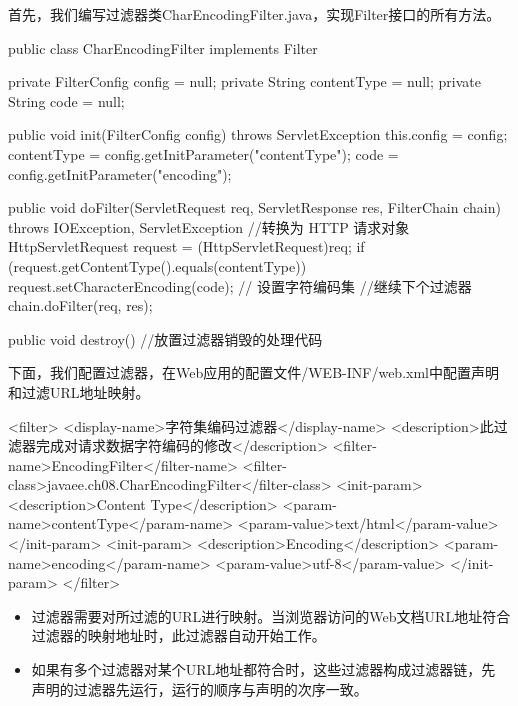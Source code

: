首先，我们编写过滤器类CharEncodingFilter.java，实现Filter接口的所有方法。


\begin{javaCode}
  public class CharEncodingFilter implements Filter {
    private FilterConfig config = null;
    private String contentType = null;
    private String code = null;

    public void init(FilterConfig config) throws ServletException {
      this.config = config;
      contentType = config.getInitParameter("contentType");
      code = config.getInitParameter("encoding");
    }

    public void doFilter(ServletRequest req, ServletResponse res, FilterChain chain) 
    throws IOException, ServletException {
      //转换为 HTTP 请求对象
      HttpServletRequest request = (HttpServletRequest)req;
      if (request.getContentType().equals(contentType)) {
        request.setCharacterEncoding(code); // 设置字符编码集
      }
      //继续下个过滤器
      chain.doFilter(req, res);
    }

    public void destroy() {
      //放置过滤器销毁的处理代码
    }
  }
\end{javaCode}

下面，我们配置过滤器，在Web应用的配置文件/WEB-INF/web.xml中配置声明和过滤URL地址映射。


\begin{xmlCode}
  <filter>
    <display-name>字符集编码过滤器</display-name>
    <description>此过滤器完成对请求数据字符编码的修改</description>
    <filter-name>EncodingFilter</filter-name>
    <filter-class>javaee.ch08.CharEncodingFilter</filter-class>
    <init-param>
      <description>Content Type</description>
      <param-name>contentType</param-name>
      <param-value>text/html</param-value>
    </init-param>
    <init-param>
      <description>Encoding</description>
      <param-name>encoding</param-name>
      <param-value>utf-8</param-value>
    </init-param>
  </filter>
\end{xmlCode}


\begin{itemize}
\item 过滤器需要对所过滤的URL进行映射。当浏览器访问的Web文档URL地址符合
  过滤器的映射地址时，此过滤器自动开始工作。
\item 如果有多个过滤器对某个URL地址都符合时，这些过滤器构成过滤器链，先
  声明的过滤器先运行，运行的顺序与声明的次序一致。
\end{itemize}

